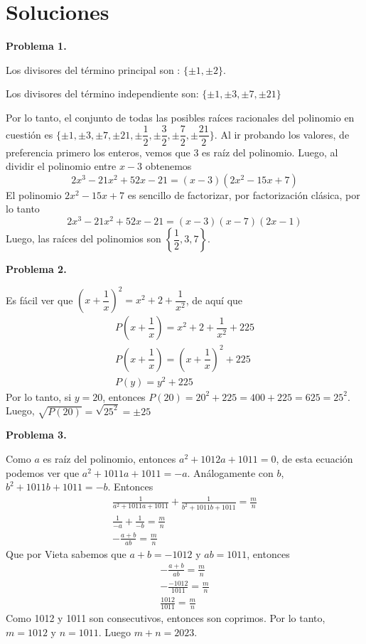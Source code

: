 \newpage
\section*{\large Soluciones}

    \textbf{Problema 1.}

Los divisores del término principal son : $\{\pm 1, \pm 2\}$.

Los divisores del término independiente son: $\{\pm 1, \pm 3, \pm 7, \pm 21\}$

Por lo tanto, el conjunto de todas las posibles raíces racionales del polinomio en cuestión es $\{\pm 1, \pm 3, \pm 7, \pm 21, \pm \dfrac{1}{2}, \pm \dfrac{3}{2}, \pm \dfrac{7}{2}, \pm \dfrac{21}{2}\}.$
Al ir probando los valores, de preferencia primero los enteros, vemos que $3$ es raíz del polinomio.
Luego, al dividir el polinomio entre $x - 3$ obtenemos
\[2 x^3 - 21 x^2 + 52 x - 21 = (x - 3)(2x^2 - 15x + 7)\]
El polinomio $2x^2 - 15x + 7$ es sencillo de factorizar, por factorización clásica, por lo tanto
\[2 x^3 - 21 x^2 + 52 x - 21 = (x - 3)(x - 7)(2x - 1)\]
Luego, las raíces del polinomios son $\left\{ \dfrac{1}{2}, 3, 7 \right\}$.


\textbf{Problema 2.}

Es fácil ver que $\left(x + \dfrac{1}{x}\right)^2 = x^2 + 2 + \dfrac{1}{x^2}$, de aquí que
\begin{gather*}
    P\left(x + \dfrac{1}{x}\right) = x^2 + 2 + \dfrac{1}{x^2} + 225\\
    P\left(x + \dfrac{1}{x}\right) = \left(x + \dfrac{1}{x}\right)^2 + 225\\
    P(y) =  y^2 + 225
\end{gather*}
Por lo tanto, si $y = 20$, entonces $P(20) = 20^2 + 225 = 400 + 225 = 625 = 25^2$.
Luego, $\sqrt {P(20)} =\sqrt {25^2} = \boxed{\pm 25}$


\textbf{Problema 3.}

Como $a$ es raíz del polinomio, entonces $a^2 + 1012a + 1011 = 0$, de esta ecuación podemos ver que $\boxed{a^2 + 1011a + 1011 = -a}$.
Análogamente con $b$, $\boxed{b^2 + 1011b + 1011 = -b}$.
Entonces
\begin{gather*}
    \frac{1}{a^2 + 1011a + 1011} + \frac{1}{b^2 + 1011b + 1011} = \frac{m}{n}\\
    \frac{1}{-a} + \frac{1}{-b} = \frac{m}{n}\\
    -\frac{a + b}{ab} = \frac{m}{n}
\end{gather*}
Que por Vieta sabemos que $a + b = - 1012$ y $ab = 1011$, entonces
\begin{gather*}
    -\frac{a + b}{ab} = \frac{m}{n}\\
    -\frac{-1012}{1011} = \frac{m}{n}\\
    \frac{1012}{1011} = \frac{m}{n}
\end{gather*}
Como 1012 y 1011 son consecutivos, entonces son coprimos.
Por lo tanto, $m = 1012$ y $n = 1011$.
Luego $m + n = \boxed{2023}.$

